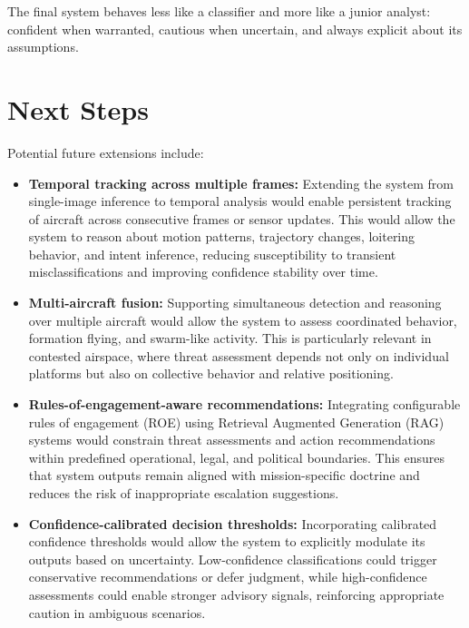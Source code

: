 \documentclass[11pt]{article}
\begin{document}
The final system behaves less like a classifier and more like a junior analyst: confident when warranted, cautious when uncertain, and always explicit about its assumptions.

\section*{Next Steps}

Potential future extensions include:

\begin{itemize}
    \item \textbf{Temporal tracking across multiple frames:}  
    Extending the system from single-image inference to temporal analysis would enable persistent tracking of aircraft across consecutive frames or sensor updates. This would allow the system to reason about motion patterns, trajectory changes, loitering behavior, and intent inference, reducing susceptibility to transient misclassifications and improving confidence stability over time.

    \item \textbf{Multi-aircraft fusion:}  
    Supporting simultaneous detection and reasoning over multiple aircraft would allow the system to assess coordinated behavior, formation flying, and swarm-like activity. This is particularly relevant in contested airspace, where threat assessment depends not only on individual platforms but also on collective behavior and relative positioning.

    \item \textbf{Rules-of-engagement-aware recommendations:}  
    Integrating configurable rules of engagement (ROE) using Retrieval Augmented Generation (RAG) systems would constrain threat assessments and action recommendations within predefined operational, legal, and political boundaries. This ensures that system outputs remain aligned with mission-specific doctrine and reduces the risk of inappropriate escalation suggestions.

    \item \textbf{Confidence-calibrated decision thresholds:}  
    Incorporating calibrated confidence thresholds would allow the system to explicitly modulate its outputs based on uncertainty. Low-confidence classifications could trigger conservative recommendations or defer judgment, while high-confidence assessments could enable stronger advisory signals, reinforcing appropriate caution in ambiguous scenarios.
\end{itemize}
\end{document}
